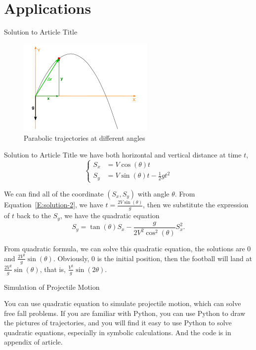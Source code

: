 \section{Applications}
\begin{frame}[t]{Solution to Article Title}
    \begin{figure}
        \centering
        \includegraphics[width=.5\textwidth]{../figures/quadratic_equation-3.png}
        \caption{Parabolic trajectories at different angles}
    \end{figure}
\end{frame}

\begin{frame}[t]{Solution to Article Title}
    we have both horizontal and vertical distance at time $t$,
    \begin{equation}\label{E:solution-2}
        \begin{cases}
            S_x &= V\cos(\theta)t \\
            S_y &= V\sin(\theta)t - \frac{1}{2} gt^2
        \end{cases}
    \end{equation}

    We can find all of the coordinate $(S_x, S_y)$ with angle $\theta$. From Equation~\eqref{E:solution-2}, we have $t=\tfrac{2V\sin(\theta)}{g}$, then we substitute the expression of $t$ back to the $S_y$, we have the quadratic equation
    \begin{equation}\label{E:solution-3}
        S_y = \tan(\theta)S_x - \frac{g}{2V^2\cos^2(\theta)}S_x^2.
    \end{equation}

    From quadratic formula, we can solve this quadratic equation, the solutions are $0$ and $\tfrac{2V^2}{g}\sin(\theta)$. Obviously, $0$ is the initial position, then the football will land at $\tfrac{2V^2}{g}\sin(\theta)$, that is, $\tfrac{V^2}{g}\sin(2\theta)$.
\end{frame}

\begin{frame}[t]{Simulation of Projectile Motion}
    \begin{block}{}
        You can use quadratic equation to simulate projectile motion, which can solve free fall problems. If you are familiar with Python, you can use Python to draw the pictures of trajectories, and you will find it easy to use Python to solve quadratic equations, especially in symbolic calculations. And the code is in appendix of article.
    \end{block}
\end{frame}



